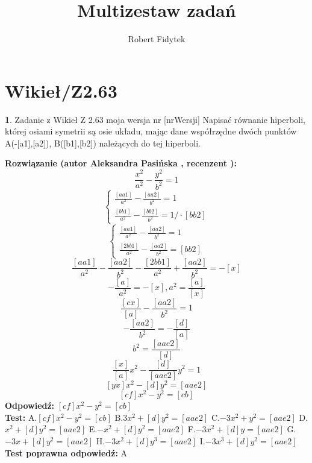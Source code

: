\documentclass[12pt, a4paper]{article}
\title{Multizestaw zadań}
\author{Robert Fidytek}
\date{}
\theoremstyle{definition} %
\newtheorem{zad}{}
\newcommand{\kategoria}[1]{\section{#1}} %
\newcommand{\zadStart}[1]{\begin{zad}#1\newline} %
\newcommand{\zadStop}{\end{zad}}   %
\newcommand{\rozwStart}[2]{\noindent \textbf{Rozwiązanie (autor #1 , recenzent #2): }\newline} %
\newcommand{\rozwStop}{\newline}                                            %
\newcommand{\odpStart}{\noindent \textbf{Odpowiedź:}\newline}    %
\newcommand{\odpStop}{\newline}                                             %
\newcommand{\testStart}{\noindent \textbf{Test:}\newline} %
\newcommand{\testStop}{\newline} %
\newcommand{\kluczStart}{\noindent \textbf{Test poprawna odpowiedź:}\newline} %
\newcommand{\kluczStop}{\newline} %
\begin{document}
\maketitle


\kategoria{Wikieł/Z2.63}
\zadStart{Zadanie z Wikieł Z 2.63 moja wersja nr [nrWersji]}
Napisać równanie hiperboli, której osiami symetrii są osie układu, mając dane współrzędne dwóch punktów A(-[a1],[a2]), B([b1],[b2]) należących do tej hiperboli.
\zadStop
\rozwStart{Aleksandra Pasińska}{}
$$\frac{x^2}{a^2}-\frac{y^2}{b^2}=1$$
$$\left\{ \begin{array}{ll}
\frac{[aa1]}{a^2}-\frac{[aa2]}{b^2}=1\\
\frac{[bb1]}{a^2}-\frac{[bb2]}{b^2}=1/\cdot [bb2]
\end{array} \right.$$
$$\left\{ \begin{array}{ll}
\frac{[aa1]}{a^2}-\frac{[aa2]}{b^2}=1\\
\frac{[2bb1]}{a^2}-\frac{[aa2]}{b^2}=[bb2]
\end{array} \right.$$
$$\frac{[aa1]}{a^2}-\frac{[aa2]}{b^2}-\frac{[2bb1]}{a^2}+\frac{[aa2]}{b^2}=-[x]$$
$$-\frac{[a]}{a^2}=-[x],a^2=\frac{[a]}{[x]}$$
$$\frac{[cx]}{[a]}-\frac{[aa2]}{b^2}=1$$
$$-\frac{[aa2]}{b^2}=-\frac{[d]}{[a]}$$
$$b^2=\frac{[aae2]}{[d]}$$
$$\frac{[x]}{[a]}x^2-\frac{[d]}{[aae2]}y^2=1$$
$$[yx]x^2-[d]y^2=[aae2]$$
$$[cf]x^2-y^2=[cb]$$
\rozwStop
\odpStart
$[cf]x^2-y^2=[cb]$\\
\odpStop
\testStart
A.$[cf]x^2-y^2=[cb]$
B.$ 3x^2+[d]y^2=[aae2]$
C.$-3x^2+y^2=[aae2]$
D.$x^2+[d]y^2=[aae2]$
E.$-x^2+[d]y^2=[aae2]$
F.$-3x^2+[d]y=[aae2]$
G.$-3x+[d]y^2=[aae2]$
H.$-3x^2+[d]y^3=[aae2]$
I.$-3x^3+[d]y^2=[aae2]$
\testStop
\kluczStart
A
\kluczStop
\end{document}
